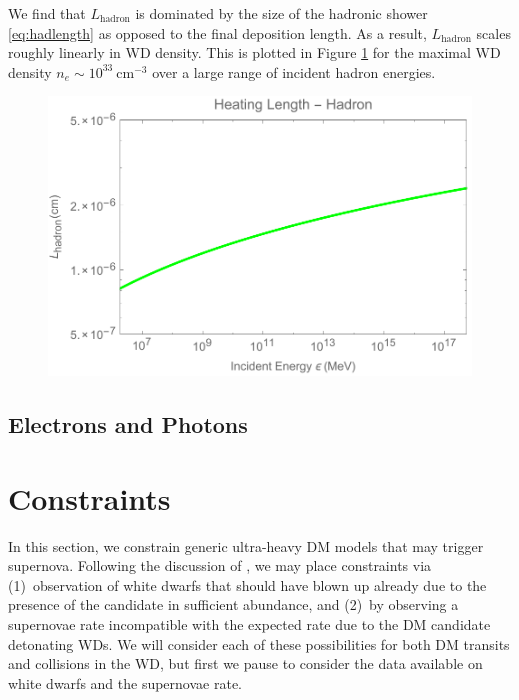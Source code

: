 \documentclass[twocolumn,showpacs,preprintnumbers,amsmath,amssymb,prd]{revtex4}
\begin{document}
We find that $L_\text{hadron}$ is dominated by the size of the hadronic shower \eqref{eq:hadlength} as opposed to the final deposition length. As a result, $L_\text{hadron}$ scales roughly linearly in WD density. This is plotted in Figure \ref{fig:Lhadron} for the maximal WD density $n_e \sim 10^{33} ~\text{cm}^{-3}$ over a large range of incident hadron energies.
\begin{figure}
\label{fig:Lhadron}
\includegraphics[scale=.45]{Lhadron.pdf}
\end{figure}


\subsection{Electrons and Photons}

\section{Constraints}
\label{sec:Constraints}

In this section, we constrain generic ultra-heavy DM models that may trigger supernova. Following the discussion of \cite{Graham:2015apa}, we may place constraints via (1)~observation of white dwarfs that should have blown up already due to the presence of the candidate in sufficient abundance, and (2)~by observing a supernovae rate incompatible with the expected rate due to the DM candidate detonating WDs. We will consider each of these possibilities for both DM transits and collisions in the WD, but first we pause to consider the data available on white dwarfs and the supernovae rate.
\end{document}
